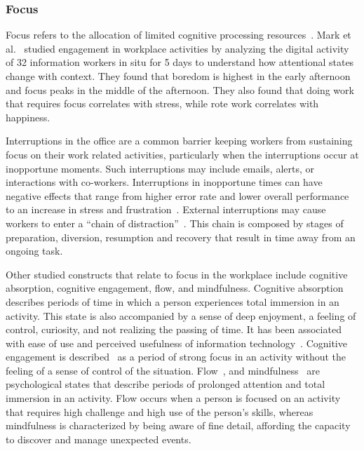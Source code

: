 
\subsubsection{Focus}
Focus refers to the allocation of limited cognitive processing resources~\cite{Anderson04}.
Mark et al.~\cite{mark2014bored} studied engagement in workplace activities by analyzing the digital activity of 32 information workers in situ for 5 days to understand how attentional states change with context. They found that boredom is highest in the early afternoon and focus peaks in the middle of the afternoon. They also found that doing work that requires focus correlates with stress, while rote work correlates with happiness.

Interruptions in the office are a common barrier keeping workers from sustaining focus on their work related activities, particularly when the interruptions occur at inopportune moments.
Such interruptions may include emails, alerts, or interactions with co-workers\cite{gonzalez2004constant,chong2006interruptions,shamsi07}. Interruptions in inopportune times can have negative effects that range from higher error rate and lower overall performance
to an increase in stress and frustration~\cite{bailey2001effects,czerwinski2000instant,mark2008cost}.
External interruptions may cause workers to enter a ``chain of distraction''~\cite{shamsi07}.
This chain is composed by stages of preparation, diversion, resumption and recovery that result in time away from an ongoing task. 

Other studied constructs that relate to focus in the workplace include cognitive absorption, cognitive engagement, flow, and mindfulness.
Cognitive absorption describes periods of time in which a person experiences total immersion in an activity.
This state is also accompanied by a sense of deep enjoyment, a feeling of control, curiosity, and not realizing the passing of time.
It has been associated with ease of use and perceived usefulness of information technology~\cite{agarwal00}.
Cognitive engagement is described~\cite{webster97} as a period of strong focus in an activity without the feeling of a sense of control of the situation.
Flow~\cite{Csikszentmihalyi90}, and mindfulness~\cite{Weick06,dane11} are psychological states that describe periods of prolonged attention and total immersion in an activity. Flow occurs when a person is focused on an activity that requires high challenge and high use of the person's skills, whereas mindfulness is characterized by being aware of fine detail, affording the capacity to discover and manage unexpected events.

